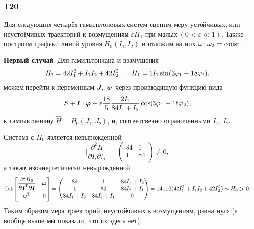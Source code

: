 \subsubsection*{Т20}


Для следующих четырёх гамильтоновых систем оценим меру устойчивых, или неустойчивых траекторий к возмущениям $\varepsilon H_1$ при малых $(0 < \varepsilon \ll 1)$. Также построим графики линий уровня $H_0 (I_1, I_2)$ и отложим на них $\omega \colon  \omega_2 = \text{const}$. 


\textbf{Первый случай}. Для гамильтониана и возмущения
\begin{equation*}
    H_0 = 42 I_1^2 + I_1 I_2 + 42 I_2^2, \hspace{5 mm} H_1 = 2 I_1 \sin(3 \varphi_1 - 18 \varphi_2),
\end{equation*}
можем перейти к переменным $\mbox{\boldmath $J$}, \ \mbox{\boldmath $\psi$}$ через производящую функцию вида
\begin{equation*}
    S + \mbox{\boldmath $I$} \cdot \mbox{\boldmath $\varphi$} + \varepsilon \frac{18}{5} \frac{2I_1}{84 I_1 + I_2} \cos(3 \varphi_1 - 18 \varphi_2),
\end{equation*}
к гамильтониану $\hat{H} = H_0(J_1, J_2)$, и, соответсвенно ограниченными $I_1$, $I_2$. 

Система с $H_0$ является невырожденной 
\begin{equation*}
    \bigg| \frac{\partial^2 H}{\partial I_i \partial I_j} \bigg| = 
    \begin{pmatrix}
        84 & 1  \\
        1 & 84  \\
    \end{pmatrix} \neq 0,
\end{equation*}
а также изоэнергетически невырожденной
\begin{equation*}
     \det \begin{bmatrix}
        \vphantom{\dfrac{1}{2}}
            \dfrac{\partial^2 H_0}{\partial \vc{I}\T \partial \vc{I}} & \vc{\omega} \\
        \vphantom{\dfrac{1}{2}}
            \vc{\omega}\T & 0
        \end{bmatrix} = \begin{pmatrix}
            84 & 1 & 84 I_1 + I_2 \\
            1 & 84 & 84 I_2 + I_1 \\
            84 I_1 + I_2 & 84 I_2 + I_1 & 0 \\
        \end{pmatrix} = 14110 (42 I_1^2 + I_1 I_2 + 42 I_2^2) \sim H_0 > 0.
\end{equation*}
Таким образом мера траекторий, неустойчивых к возмущениям, равна нуля (а вообще выше мы показали, что их здесь нет).


